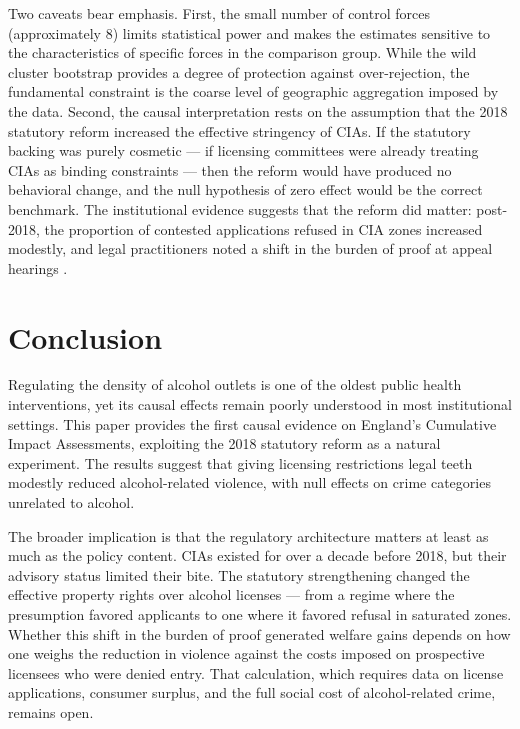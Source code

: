 \documentclass[12pt]{article}
\begin{document}
Two caveats bear emphasis. First, the small number of control forces (approximately 8) limits statistical power and makes the estimates sensitive to the characteristics of specific forces in the comparison group. While the wild cluster bootstrap provides a degree of protection against over-rejection, the fundamental constraint is the coarse level of geographic aggregation imposed by the data. Second, the causal interpretation rests on the assumption that the 2018 statutory reform increased the effective stringency of CIAs. If the statutory backing was purely cosmetic --- if licensing committees were already treating CIAs as binding constraints --- then the reform would have produced no behavioral change, and the null hypothesis of zero effect would be the correct benchmark. The institutional evidence suggests that the reform did matter: post-2018, the proportion of contested applications refused in CIA zones increased modestly, and legal practitioners noted a shift in the burden of proof at appeal hearings \citep{phillips2018licensing}.


\section{Conclusion}
\label{sec:conclusion}

Regulating the density of alcohol outlets is one of the oldest public health interventions, yet its causal effects remain poorly understood in most institutional settings. This paper provides the first causal evidence on England's Cumulative Impact Assessments, exploiting the 2018 statutory reform as a natural experiment. The results suggest that giving licensing restrictions legal teeth modestly reduced alcohol-related violence, with null effects on crime categories unrelated to alcohol.

The broader implication is that the regulatory architecture matters at least as much as the policy content. CIAs existed for over a decade before 2018, but their advisory status limited their bite. The statutory strengthening changed the effective property rights over alcohol licenses --- from a regime where the presumption favored applicants to one where it favored refusal in saturated zones. Whether this shift in the burden of proof generated welfare gains depends on how one weighs the reduction in violence against the costs imposed on prospective licensees who were denied entry. That calculation, which requires data on license applications, consumer surplus, and the full social cost of alcohol-related crime, remains open.
\end{document}
